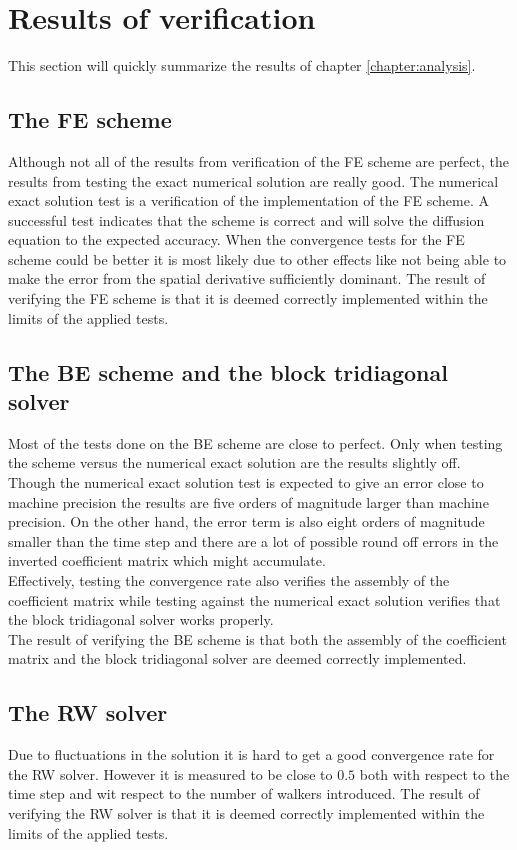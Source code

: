 \section{Results of verification}
This section will quickly summarize the results of chapter \ref{chapter:analysis}.


\subsection{The FE scheme}
Although not all of the results from verification of the FE scheme are perfect, the results from testing the exact numerical solution are really good. 
The numerical exact solution test is a verification of the implementation of the FE scheme. 
A successful test indicates that the scheme is correct and will solve the diffusion equation to the expected accuracy. 
When the convergence tests for the FE scheme could be better it is most likely due to other effects like not being able to make the error from the spatial derivative sufficiently dominant. 
The result of verifying the FE scheme is that it is deemed correctly implemented within the limits of the applied tests.

\subsection{The BE scheme and the block tridiagonal solver}
Most of the tests done on the BE scheme are close to perfect. 
Only when testing the scheme versus the numerical exact solution are the results slightly off. 
Though the numerical exact solution test is expected to give an error close to machine precision the results are five orders of magnitude larger than machine precision. 
On the other hand, the error term is also eight orders of magnitude smaller than the time step and there are a lot of possible round off errors in the inverted coefficient matrix which might accumulate. \\
Effectively, testing the convergence rate also verifies the assembly of the coefficient matrix while testing against the numerical exact solution verifies that the block tridiagonal solver works properly.\\
The result of verifying the BE scheme is that both the assembly of the coefficient matrix and the block tridiagonal solver are deemed correctly implemented. 

\subsection{The RW solver}
Due to fluctuations in the solution it is hard to get a good convergence rate for the RW solver. 
However it is measured to be close to $0.5$ both with respect to the time step and wit respect to the number of walkers introduced. 
The result of verifying the RW solver is that it is deemed correctly implemented within the limits of the applied tests.

